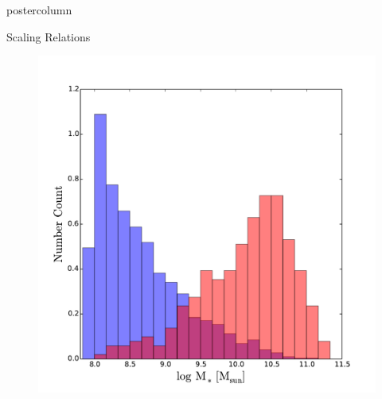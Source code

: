 \documentclass{beamer}
\begin{document}
\begin{frame}
\begin{columns}
\begin{column}{.5\textwidth}
\begin{beamercolorbox}[center,wd=\textwidth]{postercolumn}
\begin{minipage}[T]{.95\textwidth}
{\begin{myblock}{\LARGE Scaling Relations}
\begin{figure}
\begin{minipage}{0.4\textwidth}
								\centering\includegraphics[width=\textwidth]{img/Hist.pdf}
								\caption{}
							\end{minipage}
						\end{figure}


\end{myblock}}
\end{minipage}
\end{beamercolorbox}
\end{column}
\end{columns}
\end{frame}
\end{document}
